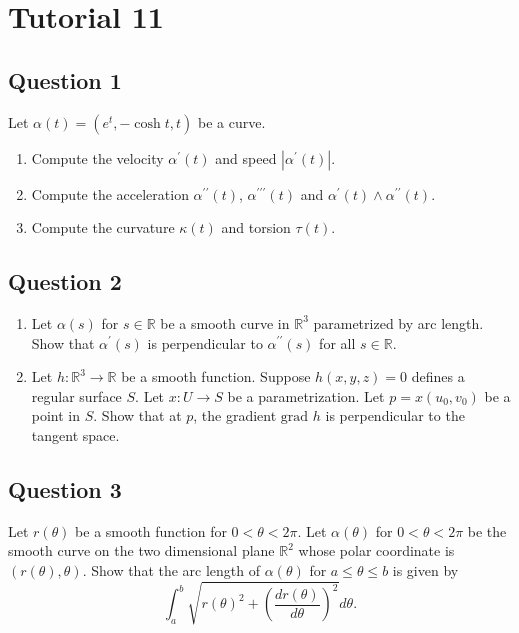 \documentclass[12pt, a4paper]{article}
\newcommand{\R}{\mathbb{R}}
\begin{document}
\section*{Tutorial 11}

\subsection*{Question 1}
Let $\alpha(t)=(e^{t},-\cosh t,t)$ be a curve.
\begin{enumerate}[label=(\roman*)]
    \item Compute the velocity $\alpha^{\prime}(t)$ and speed $|\alpha^{\prime}(t)|$.
    \item Compute the acceleration $\alpha^{\prime\prime}(t)$, $\alpha^{\prime\prime\prime}(t)$ and $\alpha^{\prime}(t)\wedge\alpha^{\prime\prime}(t)$.
    \item Compute the curvature $\kappa(t)$ and torsion $\tau(t)$.
\end{enumerate}
\newpage

\subsection*{Question 2}
\begin{enumerate}[label=(\roman*)]
    \item Let $\alpha(s)$ for $s\in\R$ be a smooth curve in $\R^{3}$ parametrized by arc length. Show that $\alpha^{\prime}(s)$ is perpendicular to $\alpha^{\prime\prime}(s)$ for all $s\in\R$.
    \item Let $h:\R^{3}\rightarrow\R$ be a smooth function. Suppose $h(x,y,z)=0$ defines a regular surface $S$. Let $x:U\rightarrow S$ be a parametrization. Let $p=x(u_{0},v_{0})$ be a point in $S$. Show that at $p$, the gradient $\text{grad } h$ is perpendicular to the tangent space.
\end{enumerate}
\newpage

\subsection*{Question 3}
Let $r(\theta)$ be a smooth function for $0<\theta<2\pi$. Let $\alpha(\theta)$ for $0<\theta<2\pi$ be the smooth curve on the two dimensional plane $\R^{2}$ whose polar coordinate is $(r(\theta),\theta)$. Show that the arc length of $\alpha(\theta)$ for $a\le\theta\le b$ is given by
\[ \int_{a}^{b}\sqrt{r(\theta)^{2}+\left(\frac{dr(\theta)}{d\theta}\right)^{2}}d\theta. \]
\newpage
\end{document}
